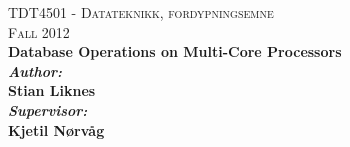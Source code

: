 \begin{center}
\vspace*{\fill}

\textsc{\LARGE TDT4501 - Datateknikk, fordypningsemne}\\[1.5cm]
\textsc{\large Fall 2012}\\[1.5cm]

\Huge \bfseries Database Operations on Multi-Core Processors\\[1.5cm]


{\large
\emph{Author:}\\
Stian Liknes\\[0.5cm]

\emph{Supervisor:}\\
Kjetil Nørvåg\\[0.5cm]
}

\vspace{\fill}
\end{center}
